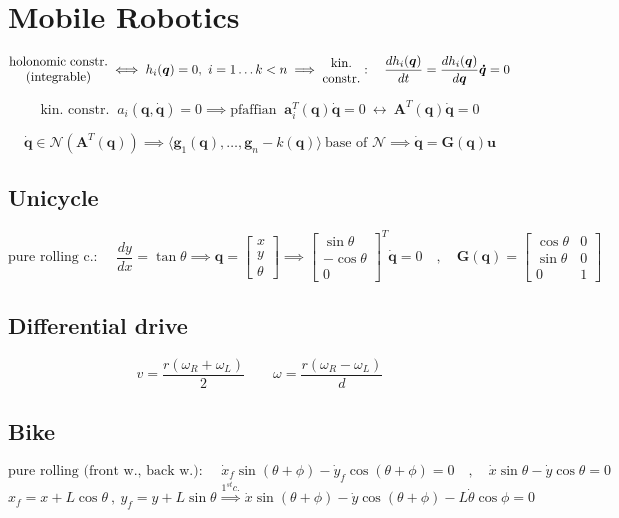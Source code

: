 \section{Mobile Robotics}

$$
\parbox{7.7em}{\centering holonomic constr. (integrable)} 
\iff
h_i(\bm{q}) = 0, \ 
i = 1\dots k < n
\implies
\parbox{3em}{\centering kin. constr.}: \quad
\frac{dh_i(\bm{q})}{dt} = \frac{dh_i(\bm{q})}{d\bm{q}}\bm{\dot{q}} = 0
$$

$$
\text{kin. constr. } \ a_i(\bm{q}, \dot{\bm{q}}) = 0
\implies \text{pfaffian } \ \bm{a}_i^T(\bm{q})\bm{\dot{q}} = 0
\ \leftrightarrow \ 
\bm{A}^T(\bm{q})\bm{\dot{q}} = 0
$$

$$
\dot{\bm{q}} \in \mathcal{N}(\bm{A}^T(\bm{q}))
\implies
\langle\bm{g}_1(\bm{q}), \dots, \bm{g}_n-k(\bm{q})\rangle \ \text{base of } \mathcal{N}
\implies
\dot{\bm{q}} = \bm{G}(\bm{q})\bm{u}
$$

\subsection{Unicycle}
$$
\text{pure rolling c.: } \quad 
\frac{dy}{dx} = \tan\theta
\implies
\bm{q} = 
\begin{bmatrix}x \\ y \\ \theta \end{bmatrix}
\implies
\begin{bmatrix}
\sin\theta \\ -\cos\theta \\ 0
\end{bmatrix}^T
\bm{\dot{q}} = 0
\quad , \quad
\bm{G}(\bm{q})
=
\begin{bmatrix}
	\cos\theta & 0 \\
	\sin\theta & 0 \\
	0 & 1
\end{bmatrix}
$$


\subsection{Differential drive}
$$
v = \frac{r(\omega_R + \omega_L)}{2}
\qquad
\omega = \frac{r(\omega_R - \omega_L)}{d}
$$

\vspace*{-15pt}
\subsection{Bike}
$$
\text{pure rolling (front w., back w.): } \quad 
\dot{x}_f\sin(\theta + \phi) - \dot{y}_f\cos(\theta + \phi) = 0
\quad , \quad
\dot{x}\sin\theta - \dot{y}\cos\theta = 0
$$
$$
x_f = x + L\cos\theta 
\ , \ 
y_f = y + L\sin\theta
\overset{1^{st} c.}{\implies}
\dot{x}\sin(\theta + \phi) - \dot{y}\cos(\theta + \phi) - L\dot{\theta}\cos\phi = 0
$$

